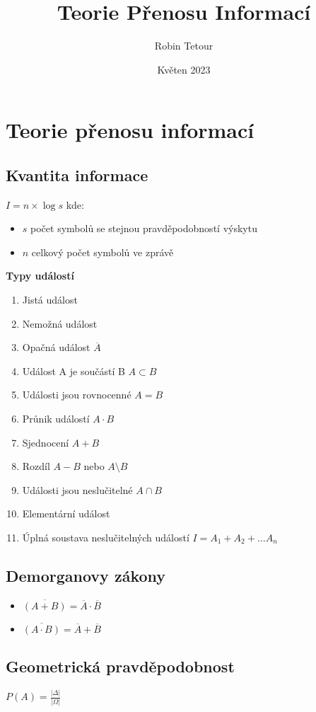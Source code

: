 \documentclass{article}
\title{Teorie Přenosu Informací}
\author{Robin Tetour}
\date{Květen 2023}
\begin{document}
\maketitle

\section{Teorie přenosu informací}
\subsection{Kvantita informace}
$I=n\times\log s$
kde:
\begin{itemize}
    \item $s$ počet symbolů se stejnou pravděpodobností výskytu
    \item $n$ celkový počet symbolů ve zprávě
\end{itemize}

\textbf{Typy událostí}
\begin{enumerate}
    \item Jistá událost
    \item Nemožná událost
    \item Opačná událost $\overline{A}$
    \item Událost A je součástí B $A\subset B$
    \item Události jsou rovnocenné $A=B$
    \item Průnik událostí $A\cdot B$
    \item Sjednocení $A+B$
    \item Rozdíl $A-B$ nebo $A\setminus B$
    \item Události jsou neslučitelné $A\cap B$
    \item Elementární událost
    \item Úplná soustava neslučitelných událostí $I=A_{1}+A_{2}+\ldots A_{n}$
\end{enumerate}

\subsection{Demorganovy zákony}
\begin{itemize}
    \item $\overline{\left(A+B\right)}=\overline{A}\cdot\overline{B}$
    \item $\overline{\left(A\cdot B\right)}=\overline{A}+\overline{B}$
\end{itemize}

\subsection{Geometrická pravděpodobnost}
$P\left(A\right)=\frac{\left|\Delta\right|}{\left|\Omega\right|}$
\end{document}
